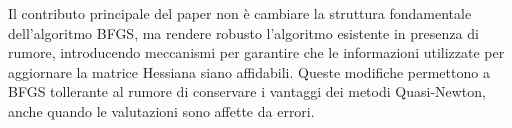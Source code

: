 Il contributo principale del paper non è cambiare la struttura fondamentale dell'algoritmo BFGS, ma rendere robusto l'algoritmo esistente in presenza di rumore, introducendo meccanismi per garantire che le informazioni utilizzate per aggiornare la matrice Hessiana siano affidabili. Queste modifiche permettono a BFGS tollerante al rumore di conservare i vantaggi dei metodi Quasi-Newton, anche quando le valutazioni sono affette da errori.
